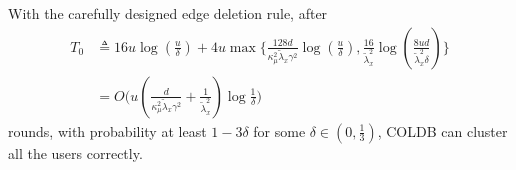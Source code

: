 \begin{lemma}\label{T0 lemma}
    With the carefully designed edge deletion rule, after 
\begin{equation*}
    \begin{aligned}
        T_0&\triangleq 16u\log(\frac{u}{\delta})+4u\max\{
        \frac{128d}{\kappa_\mu^2\tilde{\lambda}_x\gamma^2}\log(\frac{u}{\delta}),\frac{16}{\tilde{\lambda}_x^2}\log(\frac{8ud}{\tilde{\lambda}_x^2\delta})\}\\
        &=O\bigg(u\left( \frac{d}{\kappa_\mu^2\tilde{\lambda}_x\gamma^2}+\frac{1}{\tilde{\lambda}_x^2}\right)\log \frac{1}{\delta}\bigg)
    \end{aligned}
\end{equation*}
rounds, with probability at least $1-3\delta$ for some $\delta\in(0,\frac{1}{3})$, COLDB can cluster all the users correctly.
\end{lemma}
